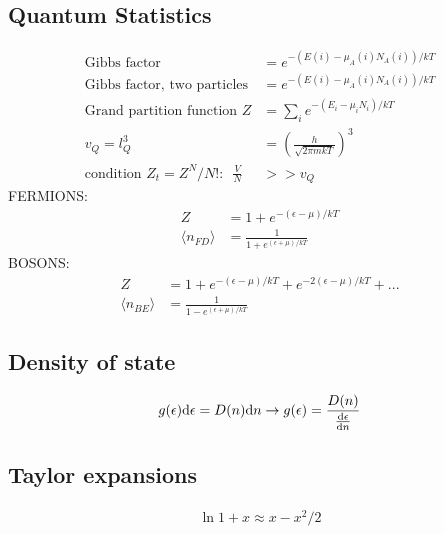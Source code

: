 \documentclass[a4paper, norsk, 8pt]{article}
\begin{document}
\begin{multicols*}{3}
\subsection*{\footnotesize  Quantum Statistics}
\begin{align*}
    \text{Gibbs factor} &= e^{-(E(i) - \mu_A(i) N_A(i))/kT} \\
    \text{Gibbs factor, two particles} &= e^{-(E(i) - \mu_A(i) N_A(i))/kT} \\
    \text{Grand partition function}\,\, Z &= \sum_i e^{-(E_i - \mu_i N_i)/kT} \\
    v_Q = l_Q^3 &= \left( \frac{h}{\sqrt{2\pi mkT}} \right)^3 \\
    \text{condition $Z_t=Z^N/N!$:}\,\,\,\, \frac{V}{N} &>> v_Q
\end{align*}
FERMIONS:
\begin{align*}
    Z &= 1 + e^{-(\epsilon-\mu)/kT} \\
    \langle n_{FD} \rangle &= \frac{1}{1+e^{(\epsilon+\mu)/kT}}
\end{align*}
BOSONS:
\begin{align*}
    Z &= 1 + e^{-(\epsilon-\mu)/kT} + e^{-2(\epsilon-\mu)/kT} + ... \\
    \langle n_{BE} \rangle &= \frac{1}{1- e^{(\epsilon+\mu)/kT}}
\end{align*}

\subsection*{\footnotesize  Density of state}
\begin{equation*}
    g(\epsilon)\mbox{d}\epsilon = D(n)\mbox{d}n \rightarrow g(\epsilon) = \frac{D(n)}{\dv{\epsilon}{n}}
\end{equation*}

\subsection*{\footnotesize  Taylor expansions}
\begin{align*}
  \ln{1+x} \approx x - x^2/2
\end{align*}

\end{multicols*}
\end{document}
